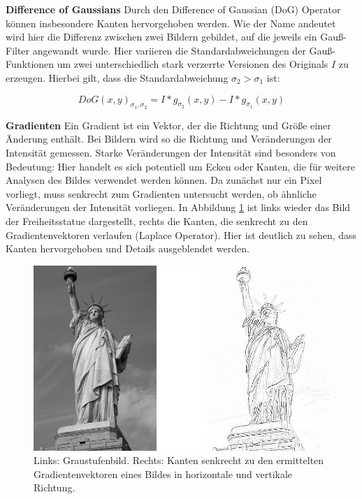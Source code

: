 \textbf{Difference of Gaussians}
Durch den Difference of Gaussian (DoG) Operator können insbesondere Kanten hervorgehoben werden. Wie der Name andeutet wird hier die Differenz zwischen zwei Bildern gebildet, auf die jeweils ein Gauß-Filter angewandt wurde. Hier variieren die Standardabweichungen der Gauß-Funktionen um zwei unterschiedlich stark verzerrte Versionen des Originals $I$ zu erzeugen. Hierbei gilt, dass die Standardabweichung $\sigma_{2} > \sigma_{1}$ ist:

$$ DoG(x, y)_{\sigma_{1}, \sigma_{2}} = I * g_{\sigma_2}(x, y) - I * g_{\sigma_1}(x, y)$$

\textbf{Gradienten} 
Ein Gradient ist ein Vektor, der die Richtung und Größe einer Änderung enthält. Bei Bildern wird so die Richtung und Veränderungen der Intensität gemessen. Starke Veränderungen der Intensität sind besonders von Bedeutung: Hier handelt es sich potentiell um Ecken oder Kanten, die für weitere Analysen des Bildes verwendet werden können. Da zunächst nur ein Pixel vorliegt, muss senkrecht zum Gradienten untersucht werden, ob ähnliche Veränderungen der Intensität vorliegen. In Abbildung \ref{img:grad} ist links wieder das Bild der Freiheitsstatue dargestellt, rechts die Kanten, die senkrecht zu den Gradientenvektoren verlaufen (Laplace Operator). Hier ist deutlich zu sehen, dass Kanten hervorgehoben und Details ausgeblendet werden.

\begin{figure}
	\centering
	\includegraphics[scale=0.5]{images/liberty_grad.png}
	\caption{Links: Graustufenbild. Rechts: Kanten senkrecht zu den ermittelten Gradientenvektoren eines Bildes in horizontale und vertikale Richtung.}
	\label{img:grad}
\end{figure}

